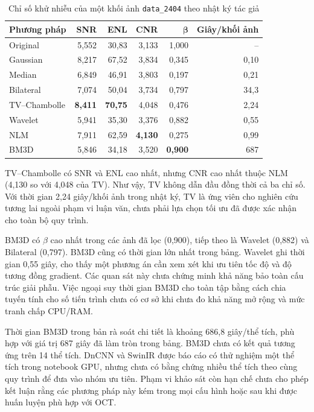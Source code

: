 \documentclass[14pt,a4paper,oneside]{extreport}
\begin{document}
\begin{table}[htbp]
  \centering
  \caption{Chỉ số khử nhiễu của một khối ảnh \texttt{data\_2404} theo nhật ký tác giả}
  \label{tab:denoise-2404-results}
  \begin{tabular}{@{}lrrrrr@{}}
    \toprule
    \textbf{Phương pháp} & \textbf{SNR} & \textbf{ENL} & \textbf{CNR} & $\boldsymbol{\beta}$ & \textbf{Giây/khối ảnh}\\
    \midrule
    Original & 5,552 & 30,83 & 3,133 & 1,000 & --\\
    Gaussian & 8,217 & 67,52 & 3,834 & 0,345 & 0,10\\
    Median & 6,849 & 46,91 & 3,803 & 0,197 & 0,21\\
    Bilateral & 7,074 & 50,04 & 3,734 & 0,797 & 34,3\\
    TV--Chambolle & \textbf{8,411} & \textbf{70,75} & 4,048 & 0,476 & 2,24\\
    Wavelet & 5,941 & 35,30 & 3,376 & 0,882 & 0,55\\
    NLM & 7,911 & 62,59 & \textbf{4,130} & 0,275 & 0,99\\
    BM3D & 5,846 & 34,18 & 3,520 & \textbf{0,900} & 687\\
    \bottomrule
  \end{tabular}
  \par{}
\end{table}

TV--Chambolle có SNR và ENL cao nhất, nhưng CNR cao nhất thuộc NLM
(4,130 so với 4,048 của TV). Như vậy, TV không dẫn đầu đồng thời cả ba chỉ
số. Với thời gian 2,24 giây/khối ảnh trong nhật ký, TV là ứng viên cho
nghiên cứu tương lai ngoài phạm vi luận văn, chưa phải lựa chọn tối ưu
đã được xác nhận cho toàn bộ quy trình.

BM3D có $\beta$ cao nhất trong các ảnh đã lọc (0,900), tiếp theo là
Wavelet (0,882) và Bilateral (0,797). BM3D cũng có thời gian lớn nhất
trong bảng. Wavelet ghi thời gian 0,55 giây, cho thấy một phương án cần
xem xét khi ưu tiên tốc độ và độ tương đồng gradient. Các quan sát này
chưa chứng minh khả năng bảo toàn cấu trúc giải phẫu. Việc ngoại suy thời gian
BM3D cho toàn tập bằng cách chia tuyến tính cho số tiến trình chưa có cơ sở
khi chưa đo khả năng mở rộng và mức tranh chấp CPU/RAM.

Thời gian BM3D trong bản rà soát chi tiết là khoảng 686,8 giây/thể
tích, phù hợp với giá trị 687 giây đã làm tròn trong bảng. BM3D
chưa có kết quả tương ứng trên 14 thể tích. DnCNN và SwinIR được
báo cáo có thử nghiệm một thể tích trong notebook GPU, nhưng chưa
có bằng chứng nhiều thể tích theo cùng quy trình để đưa vào nhóm
ưu tiên. Phạm vi khảo sát còn hạn chế chưa cho phép kết luận rằng các phương
pháp này kém trong mọi cấu hình hoặc sau khi được huấn luyện phù hợp với OCT.
\end{document}
